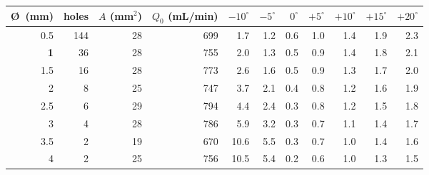 \begin{tabular}{@{}r r r r rrrrrrr@{}}
\toprule
\O\ (mm) & holes & $A$ (mm$^2$) & $Q_0$ (mL/min) & $-10^\circ$ & $-5^\circ$ & $0^\circ$ & $+5^\circ$ & $+10^\circ$ & $+15^\circ$ & $+20^\circ$ \\
\midrule
{0.5} & 144 & 28 & 699 & 1.7 & 1.2 & 0.6 & 1.0 & 1.4 & 1.9 & 2.3 \\
\textbf{1} & 36 & 28 & 755 & 2.0 & 1.3 & 0.5 & 0.9 & 1.4 & 1.8 & 2.1 \\
{1.5} & 16 & 28 & 773 & 2.6 & 1.6 & 0.5 & 0.9 & 1.3 & 1.7 & 2.0 \\
{2} & 8 & 25 & 747 & 3.7 & 2.1 & 0.4 & 0.8 & 1.2 & 1.6 & 1.9 \\
{2.5} & 6 & 29 & 794 & 4.4 & 2.4 & 0.3 & 0.8 & 1.2 & 1.5 & 1.8 \\
{3} & 4 & 28 & 786 & 5.9 & 3.2 & 0.3 & 0.7 & 1.1 & 1.4 & 1.7 \\
{3.5} & 2 & 19 & 670 & 10.6 & 5.5 & 0.3 & 0.7 & 1.0 & 1.4 & 1.6 \\
{4} & 2 & 25 & 756 & 10.5 & 5.4 & 0.2 & 0.6 & 1.0 & 1.3 & 1.5 \\
\bottomrule
\end{tabular}
